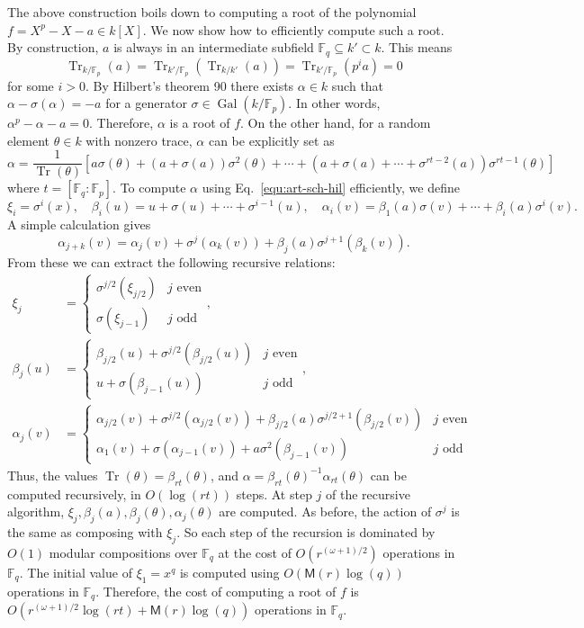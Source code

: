 \documentclass{mcom-l}
\theoremstyle{plain}
\theoremstyle{definition}
\DeclareMathOperator{\trace}{Tr} %
\DeclareMathOperator{\gal}{Gal} %
\newcommand{\F}{\ensuremath{\mathbb{F}}}
\newcommand{\MM}{\ensuremath{\mathsf{M}}}
\newcounter{algorithm}
\begin{document}
The above construction boils down to computing a root of the polynomial $f = X^p - X - a \in k[X]$.
We now show how to efficiently compute such a root.
By construction, $a$ is always in an intermediate subfield 
$\F_q \subseteq k' \subset k$. This means 
\[ \trace_{k / \F_p}(a) = \trace_{k' / \F_p}(\trace_{k / k'}(a)) = \trace_{k' / \F_p}(p^ia) = 0  \]
for some $i > 0$. By Hilbert's theorem 90 there exists $\alpha \in k$ such that $\alpha - 
\sigma(\alpha) = -a$ for a generator $\sigma \in \gal(k / \F_p)$. In other words, $\alpha^p - 
\alpha - a = 0$. Therefore, $\alpha$ is a root of $f$. On the other hand, for a random element 
$\theta \in k$ with nonzero trace, $\alpha$ can be explicitly set as
\begin{equation}
	\label{equ:art-sch-hil}
	\alpha = \frac{1}{\trace(\theta)}[a\sigma(\theta) + (a + \sigma(a))\sigma^2(\theta) + \cdots + 
	(a + \sigma(a) + \cdots + \sigma^{rt - 2}(a))\sigma^{rt - 1}(\theta)]
\end{equation}
where $t = [\F_q : \F_p]$.
To compute $\alpha$ using Eq.~\eqref{equ:art-sch-hil} efficiently, we define
\[ \xi_i = \sigma^i(x), \quad \beta_i(u) = u + \sigma(u) + \cdots + \sigma^{i - 1}(u), \quad 
\alpha_i(v) = \beta_1(a)\sigma(v) + \cdots + \beta_i(a)\sigma^i(v). \]
A simple calculation gives
\[ \alpha_{j + k}(v) = \alpha_j(v) + \sigma^j(\alpha_k(v)) + \beta_j(a)\sigma^{j + 1}(\beta_k(v)). 
\]
From these we can extract the following recursive relations:
\[
\begin{aligned}
	\xi_j & = 
	\begin{cases}
		\sigma^{j / 2}(\xi_{j / 2}) & j \text{ even} \\
		\sigma(\xi_{j - 1}) & j \text{ odd}
	\end{cases}, \\
	\beta_j(u) & = 
	\begin{cases}
		\beta_{j / 2}(u) + \sigma^{j / 2}(\beta_{j / 2}(u)) & j \text{ even} \\
		u + \sigma(\beta_{j - 1}(u)) & j \text{ odd}
	\end{cases}, \\
	\alpha_{j}(v) & = 
	\begin{cases}
		\alpha_{j / 2}(v) + \sigma^{j / 2}(\alpha_{j / 2}(v)) + \beta_{j / 2}(a)\sigma^{j / 2 + 
		1}(\beta_{j / 2}(v)) & j \text{ even} \\
		\alpha_1(v) + \sigma(\alpha_{j - 1}(v)) + a\sigma^2(\beta_{j - 1}(v)) & j \text{ odd} 
	\end{cases}
\end{aligned}
\]
Thus, the values $\trace(\theta) = \beta_{rt}(\theta)$, and $\alpha = 
\beta_{rt}(\theta)^{-1}\alpha_{rt}(\theta)$ can be computed recursively, in $O(\log(rt))$ steps. At 
step $j$ of the recursive algorithm, $\xi_j, \beta_j(a), \beta_j(\theta), \alpha_j(\theta)$ are 
computed. As before, the action of $\sigma^j$ is the same as composing with $\xi_j$. So each step 
of the recursion is dominated by $O(1)$ modular compositions over $\F_q$ at the cost of $O(r^{(\omega+1)/2})$ 
operations in $\F_q$. The initial value of $\xi_1 = x^q$ is computed using $O(\MM(r)\log(q))$ 
operations in $\F_q$. Therefore, the cost of computing a root of $f$ is $O(r^{(\omega+1)/2}\log(rt) + 
\MM(r)\log(q))$ operations in $\F_q$.
\end{document}
